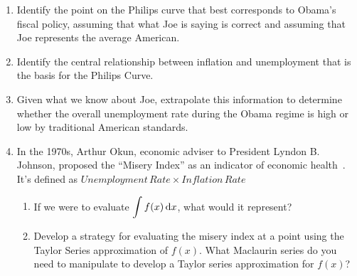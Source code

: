 \begin{enumerate}[itemsep=0.5cm]
            \begin{adjustwidth}{0.3in}{0.3in}
                  \begin{enumerate}[itemsep=0.5cm]

                        \item Identify the point on the Philips curve that best
                              corresponds to Obama's fiscal policy, assuming that
                              what Joe is saying is correct and assuming that Joe
                              represents the average American.
                        \item Identify the central relationship between inflation
                              and unemployment that is the basis for the Philips Curve.

                        \item Given what we know about Joe, extrapolate this
                              information to determine whether the overall unemployment
                              rate during the Obama regime is high or low by traditional
                              American standards.

                              \clearpage

                        \item
                              In the 1970s, Arthur Okun, economic adviser to
                              President Lyndon B. Johnson, proposed the ``Misery
                              Index'' as an indicator of economic
                              health~\cite{inflationdata}. It's defined as
                              $Unemployment\,Rate \times Inflation\,Rate$

                              \begin{enumerate}
                                    \item If we were to evaluate $\displaystyle \int f(x) \,
                                                \differential x$, what would it represent?

                                    \item Develop a strategy for evaluating the misery
                                          index at a point using the Taylor Series
                                          approximation of $f(x)$. What Maclaurin series do
                                          you need to manipulate to develop a Taylor series
                                          approximation for $f(x)$?


\end{enumerate}
\end{enumerate}
\end{adjustwidth}
\end{enumerate}

